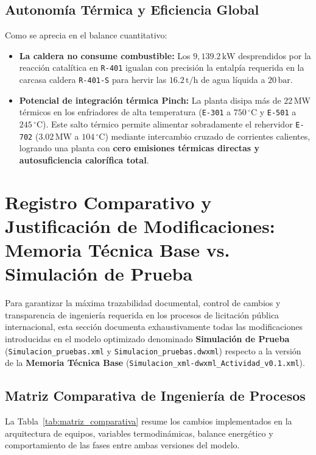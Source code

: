 \documentclass[11pt,a4paper]{article}
\begin{document}
\subsection{Autonomía Térmica y Eficiencia Global}
Como se aprecia en el balance cuantitativo:
\begin{itemize}
    \item \textbf{La caldera no consume combustible:} Los $9{,}139.2\,\text{kW}$ desprendidos por la reacción catalítica en \texttt{R-401} igualan con precisión la entalpía requerida en la carcasa caldera \texttt{R-401-S} para hervir las $16.2\,\text{t/h}$ de agua líquida a $20\,\text{bar}$.
    \item \textbf{Potencial de integración térmica Pinch:} La planta disipa más de $22\,\text{MW}$ térmicos en los enfriadores de alta temperatura (\texttt{E-301} a $750\,^\circ\text{C}$ y \texttt{E-501} a $245\,^\circ\text{C}$). Este salto térmico permite alimentar sobradamente el rehervidor \texttt{E-702} ($3.02\,\text{MW}$ a $104\,^\circ\text{C}$) mediante intercambio cruzado de corrientes calientes, logrando una planta con \textbf{cero emisiones térmicas directas y autosuficiencia calorífica total}.
\end{itemize}


\section{Registro Comparativo y Justificación de Modificaciones: Memoria Técnica Base vs. Simulación de Prueba}

Para garantizar la máxima trazabilidad documental, control de cambios y transparencia de ingeniería requerida en los procesos de licitación pública internacional, esta sección documenta exhaustivamente todas las modificaciones introducidas en el modelo optimizado denominado \textbf{Simulación de Prueba} (\texttt{Simulacion\_pruebas.xml} y \texttt{Simulacion\_pruebas.dwxml}) respecto a la versión de la \textbf{Memoria Técnica Base} (\texttt{Simulacion\_xml-dwxml\_Actividad\_v0.1.xml}).

\subsection{Matriz Comparativa de Ingeniería de Procesos}
La Tabla~\ref{tab:matriz_comparativa} resume los cambios implementados en la arquitectura de equipos, variables termodinámicas, balance energético y comportamiento de las fases entre ambas versiones del modelo.
\end{document}
